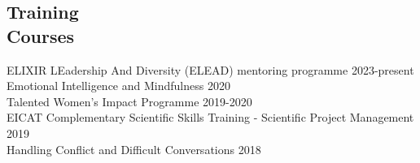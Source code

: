 \documentclass[margin,line]{res}
\begin{document}
\begin{resume}



\section{\sc Training\\ Courses}

ELIXIR LEadership And Diversity (ELEAD) mentoring programme \hfill {2023-present}\\
Emotional Intelligence and Mindfulness \hfill {2020}\\
Talented Women's Impact Programme \hfill {2019-2020}\\
EICAT Complementary Scientific Skills Training - Scientific Project Management \hfill {2019}\\
Handling Conflict and Difficult Conversations \hfill {2018}

\end{resume}
\end{document}
